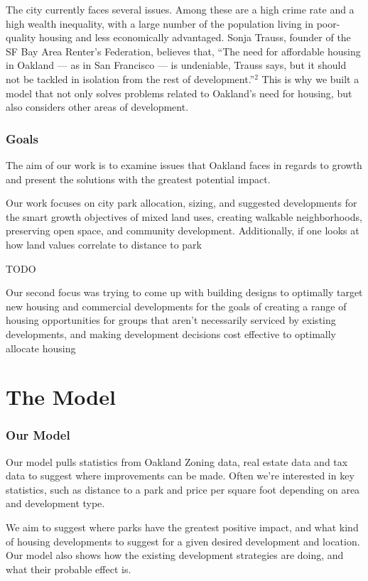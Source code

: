 \documentclass[]{report}
\begin{document}
	The city currently faces several issues. Among these are a high crime rate and a high wealth inequality, with a large number of the population living in poor-quality housing and less economically advantaged. Sonja Trauss, founder of the SF Bay Area Renter’s Federation, believes that, “The need for affordable housing in Oakland — as in San Francisco — is undeniable, Trauss says, but it should not be tackled in isolation from the rest of development.”$^{2}$ This is why we built a model that not only solves problems related to Oakland's need for housing, but also considers other areas of development.
		
	\section{Goals}
	The aim of our work is to examine issues that Oakland faces in regards to growth and present the solutions with the greatest potential impact.
	
	Our work focuses on city park allocation, sizing, and suggested developments for the smart growth objectives of mixed land uses, creating walkable neighborhoods, preserving open space, and community development. Additionally, if one looks at how land values correlate to distance to park
	
	TODO
	
	Our second focus was trying to come up with building designs to optimally target new housing and commercial developments for the goals of creating a range of housing opportunities for groups that aren't necessarily serviced by existing developments, and making development decisions cost effective to optimally allocate housing
	
	
\part{The Model}
	\section{Our Model}
	Our model pulls statistics from Oakland Zoning data, real estate data and tax data to suggest where improvements can be made. Often we're interested in key statistics, such as distance to a park and price per square foot depending on area and development type.
	
	We aim to suggest where parks have the greatest positive impact, and what kind of housing developments to suggest for a given desired development and location. Our model also shows how the existing development strategies are doing, and what their probable effect is.
	
\end{document}

